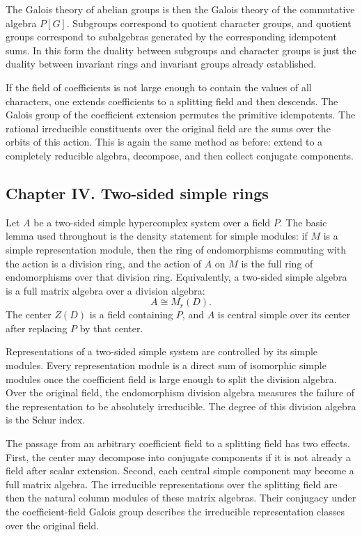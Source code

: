 \documentclass[12pt]{article}
\begin{document}
The Galois theory of abelian groups is then the Galois theory of the commutative algebra \(P[G]\). Subgroups correspond to quotient character groups, and quotient groups correspond to subalgebras generated by the corresponding idempotent sums. In this form the duality between subgroups and character groups is just the duality between invariant rings and invariant groups already established.

If the field of coefficients is not large enough to contain the values of all characters, one extends coefficients to a splitting field and then descends. The Galois group of the coefficient extension permutes the primitive idempotents. The rational irreducible constituents over the original field are the sums over the orbits of this action. This is again the same method as before: extend to a completely reducible algebra, decompose, and then collect conjugate components.

\subsection{Chapter IV. Two-sided simple rings}

Let \(A\) be a two-sided simple hypercomplex system over a field \(P\). The basic lemma used throughout is the density statement for simple modules: if \(M\) is a simple representation module, then the ring of endomorphisms commuting with the action is a division ring, and the action of \(A\) on \(M\) is the full ring of endomorphisms over that division ring. Equivalently, a two-sided simple algebra is a full matrix algebra over a division algebra:
\[
  A\cong M_r(D).
\]
The center \(Z(D)\) is a field containing \(P\), and \(A\) is central simple over its center after replacing \(P\) by that center.

Representations of a two-sided simple system are controlled by its simple modules. Every representation module is a direct sum of isomorphic simple modules once the coefficient field is large enough to split the division algebra. Over the original field, the endomorphism division algebra measures the failure of the representation to be absolutely irreducible. The degree of this division algebra is the Schur index.

The passage from an arbitrary coefficient field to a splitting field has two effects. First, the center may decompose into conjugate components if it is not already a field after scalar extension. Second, each central simple component may become a full matrix algebra. The irreducible representations over the splitting field are then the natural column modules of these matrix algebras. Their conjugacy under the coefficient-field Galois group describes the irreducible representation classes over the original field.
\end{document}
